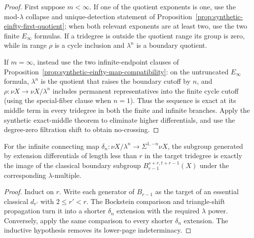 \begin{proof}
  First suppose $m<\infty$.  If one of the quotient exponents is one, use the
  mod-$\lambda$ collapse and unique-detection statement of
  Proposition~\ref{prop:synthetic-einfty-first-quotient}; when both relevant
  exponents are at least two, use the two finite $E_\infty$ formulas.  If a
  tridegree is outside the quotient range its group is zero, while in range
  $\rho$ is a cycle inclusion and $\lambda^n$ is a boundary quotient.

  If $m=\infty$, instead use the two infinite-endpoint clauses of
  Proposition~\ref{prop:synthetic-einfty-map-compatibility}: on the
  untruncated $E_\infty$ formula, $\lambda^n$ is the quotient that raises the
  boundary cutoff by $n$, and
  $\rho:\nu X\to\nu X/\lambda^n$ includes permanent representatives into the
  finite cycle cutoff (using the special-fiber clause when $n=1$).  Thus the
  sequence is exact at its middle term in every tridegree in both the finite
  and infinite branches.
  Apply the synthetic exact-middle theorem to eliminate higher differentials,
  and use the degree-zero filtration shift to obtain no-crossing.
\end{proof}

\begin{lemma}
  \label{lem:delta-images-equal-classical-boundaries}
  \notready
  For the infinite connecting map
  $\delta_n:\nu X/\lambda^n\to\Sigma^{1,-n}\nu X$, the subgroup generated by
  extension differentials of length less than $r$ in the target tridegree is
  exactly the image of the classical boundary subgroup
  $B_{r-1}^{s+r,t+r-1}(X)$ under the corresponding $\lambda$-multiple.
\end{lemma}

\begin{proof}
  Induct on $r$.  Write each generator of $B_{r-1}$ as the target of an
  essential classical $d_{r'}$ with $2\le r'<r$.  The Bockstein comparison and
  triangle-shift propagation turn it into a shorter $\delta_n$ extension with
  the required $\lambda$ power.  Conversely, apply the same comparison to
  every shorter $\delta_n$ extension.  The inductive hypothesis removes its
  lower-page indeterminacy.
\end{proof}

